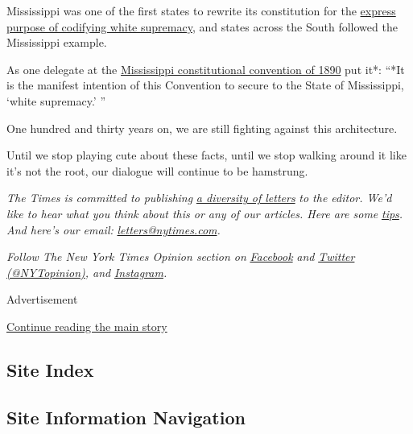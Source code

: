 Mississippi was one of the first states to rewrite its constitution for
the
\href{https://www.jstor.org/stable/25434804?read-now=1\&seq=1}{express
purpose of codifying white supremacy}, and states across the South
followed the Mississippi example.

As one delegate at the
\href{https://archive.org/stream/journalproceedi01convgoog\#page/n273/mode/2up/search/It+is+the+manifest+intention+of+this+Convention+to+secure+to+the+State+of+Mississippi}{Mississippi
constitutional convention of 1890} put it*: ``*It is the manifest
intention of this Convention to secure to the State of Mississippi,
`white supremacy.' ''

One hundred and thirty years on, we are still fighting against this
architecture.

Until we stop playing cute about these facts, until we stop walking
around it like it's not the root, our dialogue will continue to be
hamstrung.

\emph{The Times is committed to publishing}
\href{https://www.nytimes.com/2019/01/31/opinion/letters/letters-to-editor-new-york-times-women.html}{\emph{a
diversity of letters}} \emph{to the editor. We'd like to hear what you
think about this or any of our articles. Here are some}
\href{https://help.nytimes.com/hc/en-us/articles/115014925288-How-to-submit-a-letter-to-the-editor}{\emph{tips}}\emph{.
And here's our email:}
\href{mailto:letters@nytimes.com}{\emph{letters@nytimes.com}}\emph{.}

\emph{Follow The New York Times Opinion section on}
\href{https://www.facebook.com/nytopinion}{\emph{Facebook}} \emph{and}
\href{http://twitter.com/NYTOpinion}{\emph{Twitter
(@NYTopinion)}}\emph{, and}
\href{https://www.instagram.com/nytopinion/}{\emph{Instagram}}\emph{.}

Advertisement

\protect\hyperlink{after-bottom}{Continue reading the main story}

\hypertarget{site-index}{%
\subsection{Site Index}\label{site-index}}

\hypertarget{site-information-navigation}{%
\subsection{Site Information
Navigation}\label{site-information-navigation}}


